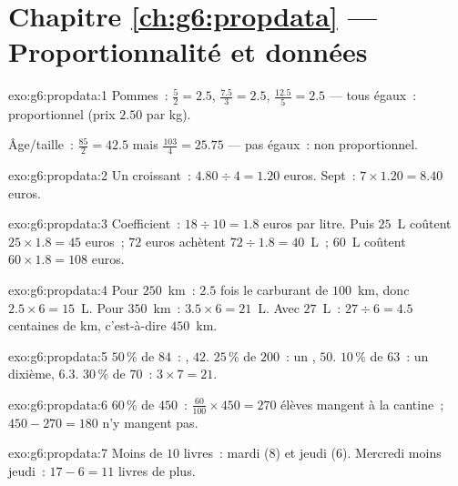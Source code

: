 \section*{Chapitre \ref{ch:g6:propdata} --- Proportionnalité et données}

\begin{solution}{exo:g6:propdata:1}
Pommes~:  $\frac52 = 2.5$, $\frac{7.5}{3} = 2.5$,
$\frac{12.5}{5} = 2.5$ --- tous égaux~: proportionnel (prix
$2.50$ par kg).

Âge/taille~: $\frac{85}{2} = 42.5$ mais $\frac{103}{4} = 25.75$ ---
pas égaux~: non proportionnel.
\end{solution}

\begin{solution}{exo:g6:propdata:2}
Un croissant~: $4.80 \div 4 = 1.20$ euros. Sept~:
$7 \times 1.20 = 8.40$ euros.
\end{solution}

\begin{solution}{exo:g6:propdata:3}
Coefficient~: $18 \div 10 = 1.8$ euros par litre. Puis
$25$~L coûtent $25 \times 1.8 = 45$ euros~; $72$ euros achètent
$72 \div 1.8 = 40$~L~; $60$~L coûtent $60 \times 1.8 = 108$ euros.
\end{solution}

\begin{solution}{exo:g6:propdata:4}
Pour $250$~km~: $2.5$ fois le carburant de $100$~km, donc
$2.5 \times 6 = 15$~L. Pour $350$~km~: $3.5 \times 6 = 21$~L. Avec
$27$~L~: $27 \div 6 = 4.5$ centaines de km, c'est-à-dire $450$~km.
\end{solution}

\begin{solution}{exo:g6:propdata:5}
$50\,\%$ de $84$~: , $42$. \quad
$25\,\%$ de $200$~: un , $50$. \quad
$10\,\%$ de $63$~: un dixième, $6.3$. \quad
$30\,\%$ de $70$~: $3 \times 7 = 21$.
\end{solution}

\begin{solution}{exo:g6:propdata:6}
$60\,\%$ de $450$~: $\frac{60}{100} \times 450 = 270$ élèves mangent
à la cantine~; $450 - 270 = 180$ n'y mangent pas.
\end{solution}

\begin{solution}{exo:g6:propdata:7}
Moins de $10$ livres~: mardi ($8$) et jeudi ($6$). Mercredi moins
jeudi~: $17 - 6 = 11$ livres de plus.
\end{solution}

